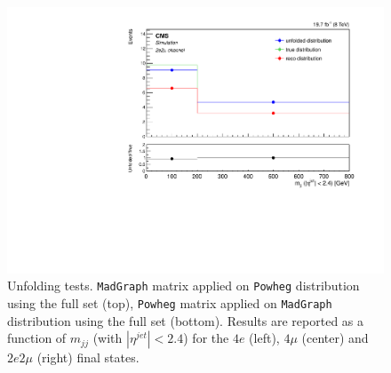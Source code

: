 \begin{figure}[hbtp]
\begin{center}
    \includegraphics[width=0.8\cmsFigWidth]{Figures/Unfolding/MCTests/CentralMjj_ZZTo2e2m_PowMatrix_MadDistr_FullSample_fr}  
 \caption{Unfolding tests. \texttt{MadGraph} matrix applied on \texttt{Powheg} distribution using the full set (top), \texttt{Powheg} matrix applied on \texttt{MadGraph} distribution using the full set (bottom). Results are reported as a function of $m_{jj}$ (with $|\eta^{jet}|<2.4$) for the $4e$ (left), $4\mu$ (center) and $2e2\mu$ (right) final states.}
    \label{fig:MCtest_CentralMjj2}
  \end{center}
\end{figure}
\clearpage 
